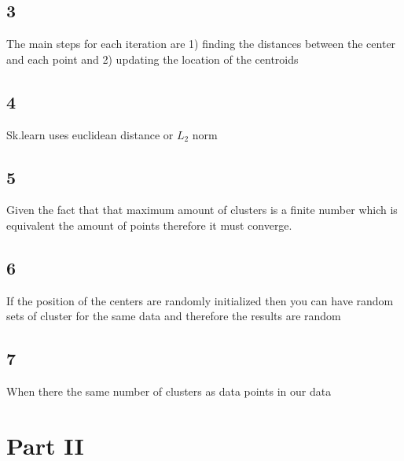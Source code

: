 \documentclass[11pt]{article}
\begin{document}
		\subsection*{3}
			The main steps for each iteration are 1) finding the distances between the center and each point and 2) updating the location of the centroids
		\subsection*{4}
			Sk.learn uses euclidean distance or $L_2$ norm 
		\subsection*{5}
			Given the fact that that maximum amount of clusters is a finite number which is equivalent the amount of points therefore it must converge.
		\subsection*{6}
			If the position of the centers are randomly initialized then you can have random sets of cluster for the same data and therefore the results are random
		\subsection*{7}
			When there the same number of clusters as data points in our data
	\section*{Part II}
\end{document}
